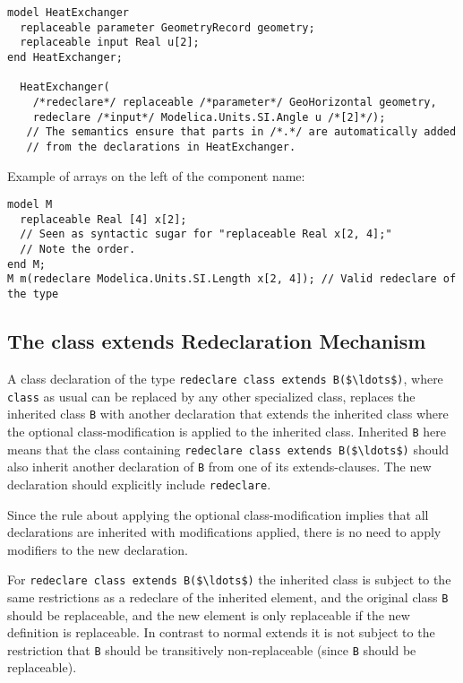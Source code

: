 \begin{nonnormative}
\begin{lstlisting}[language=modelica]
model HeatExchanger
  replaceable parameter GeometryRecord geometry;
  replaceable input Real u[2];
end HeatExchanger;

  HeatExchanger(
    /*redeclare*/ replaceable /*parameter*/ GeoHorizontal geometry,
    redeclare /*input*/ Modelica.Units.SI.Angle u /*[2]*/);
   // The semantics ensure that parts in /*.*/ are automatically added
   // from the declarations in HeatExchanger.
\end{lstlisting}

Example of arrays on the left of the component name:
\begin{lstlisting}[language=modelica]
model M
  replaceable Real [4] x[2];
  // Seen as syntactic sugar for "replaceable Real x[2, 4];"
  // Note the order.
end M;
M m(redeclare Modelica.Units.SI.Length x[2, 4]); // Valid redeclare of the type
\end{lstlisting}
\end{nonnormative}

\subsection{The class extends Redeclaration Mechanism}\label{the-class-extends-redeclaration-mechanism}

A class declaration of the type \lstinline!redeclare class extends B($\ldots$)!, where \lstinline!class! as usual can be replaced by any other specialized class, replaces the inherited class \lstinline!B! with another declaration that extends the inherited class where the optional class-modification is applied to the inherited class.  Inherited \lstinline!B! here means that the class containing \lstinline!redeclare class extends B($\ldots$)! should also inherit another declaration of \lstinline!B! from one of its extends-clauses.  The new declaration should explicitly include \lstinline!redeclare!.

\begin{nonnormative}
Since the rule about applying the optional class-modification implies that all declarations are inherited with modifications applied, there is no need
to apply modifiers to the new declaration.
\end{nonnormative}

For \lstinline!redeclare class extends B($\ldots$)! the inherited class is subject
to the same restrictions as a redeclare of the inherited element, and
the original class \lstinline!B! should be replaceable, and the new element is only
replaceable if the new definition is replaceable. In contrast to normal
extends it is not subject to the restriction that \lstinline!B! should be
transitively non-replaceable (since \lstinline!B! should be replaceable).

